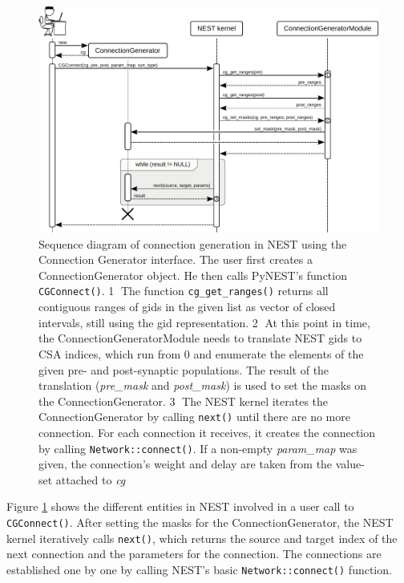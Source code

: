 \documentclass{frontiersSCNS} %
\begin{document}
\begin{figure}[ht]
\centering
\includegraphics[scale=.8]{figures/sequence_diagram_nest.pdf}
\caption{Sequence diagram of connection generation in NEST using the
  Connection Generator interface. The user first creates a
  ConnectionGenerator object. He then calls PyNEST's function
  \texttt{CGConnect()}. \textcircled{\footnotesize 1} The function
  \texttt{cg\_get\_ranges()} returns all contiguous ranges of gids in
  the given list as vector of closed intervals, still using the gid
  representation. \textcircled{\footnotesize 2} At this point in time,
  the ConnectionGeneratorModule needs to translate NEST gids to CSA
  indices, which run from 0 and enumerate the elements of the given
  pre- and post-synaptic populations. The result of the translation
  (\emph{pre\_mask} and \emph{post\_mask}) is used to set the masks on
  the ConnectionGenerator. \textcircled{\footnotesize 3} The NEST
  kernel iterates the ConnectionGenerator by calling \texttt{next()}
  until there are no more connection. For each connection it receives,
  it creates the connection by calling \texttt{Network::connect()}. If
  a non-empty \emph{param\_map} was given, the connection's weight and
  delay are taken from the value-set attached to
  \emph{cg}}\label{fig:sequence_diagram_nest}
\end{figure}

Figure \ref{fig:sequence_diagram_nest} shows the different entities in
NEST involved in a user call to \texttt{CGConnect()}. After setting
the masks for the ConnectionGenerator, the NEST kernel iteratively
calls \texttt{next()}, which returns the source and target index of
the next connection and the parameters for the connection. The
connections are established one by one by calling NEST's basic
\texttt{Network::connect()} function.
\end{document}
